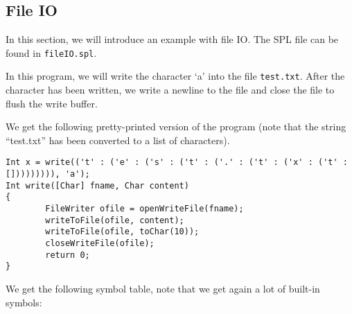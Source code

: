 \documentclass[a4paper]{article}
\begin{document}
\subsection{File IO}
In this section, we will introduce an example with file IO. The SPL file can be found in {\tt fileIO.spl}. 

In this program, we will write the character `a' into the file {\tt test.txt}. After the character has been written, we write a newline to the file and close the file to flush the write buffer. 

We get the following pretty-printed version of the program (note that the string ``test.txt'' has been converted to a list of characters). 
\begin{verbatim}
Int x = write(('t' : ('e' : ('s' : ('t' : ('.' : ('t' : ('x' : ('t' : [])))))))), 'a');
Int write([Char] fname, Char content)
{
        FileWriter ofile = openWriteFile(fname);
        writeToFile(ofile, content);
        writeToFile(ofile, toChar(10));
        closeWriteFile(ofile);
        return 0;
}
\end{verbatim}
We get the following symbol table, note that we get again a lot of built-in symbols: 
\end{document}

